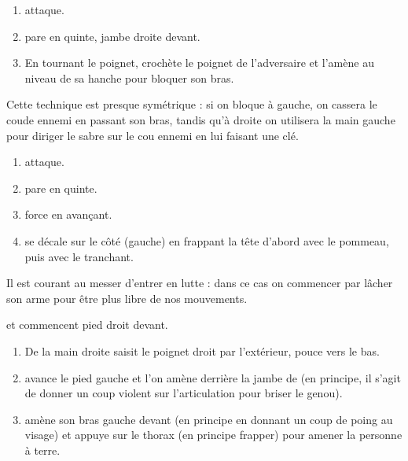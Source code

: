 \begin{technique}

\begin{enumerate}
	\item \A attaque.
	
	\item \D pare en quinte, jambe droite devant.
	
	\item En tournant le poignet, \D crochète le poignet de l'adversaire et l'amène au niveau de sa hanche pour bloquer son bras.
\end{enumerate}

Cette technique est presque symétrique : si on bloque à gauche, on cassera le coude ennemi en passant son bras, tandis qu'à droite on utilisera la main gauche pour diriger le sabre sur le cou ennemi en lui faisant une clé.
\end{technique}


\begin{technique}

\begin{enumerate}
	\item \A attaque.
	
	\item \D pare en quinte.
	
	\item \A force en avançant.
	
	\item \D se décale sur le côté (gauche) en frappant la tête d'abord avec le pommeau, puis avec le tranchant.
\end{enumerate}
\end{technique}


Il est courant au messer d'entrer en lutte : dans ce cas on commencer par lâcher son arme pour être plus libre de nos mouvements.


\begin{technique}

\A et \D commencent pied droit devant.

\begin{enumerate}
	\item De la main droite \A saisit le poignet droit par l'extérieur, pouce vers le bas.
	
	\item \A avance le pied gauche et l'on amène derrière la jambe de \D (en principe, il s'agit de donner un coup violent sur l'articulation pour briser le genou).
	
	\item \A amène son bras gauche devant (en principe en donnant un coup de poing au visage) et appuye sur le thorax (en principe frapper) pour amener la personne à terre.
\end{enumerate}
\end{technique}


